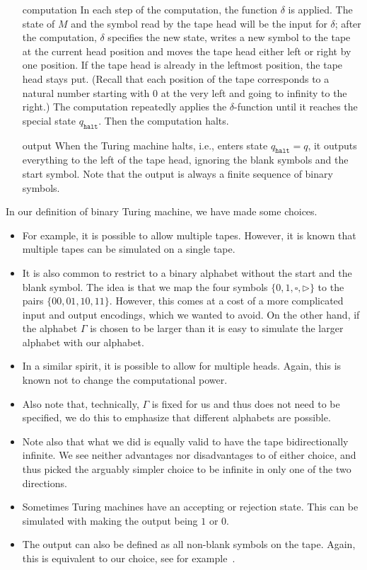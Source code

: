 \documentclass{article}
\begin{document}
\begin{definition}
\begin{itemize}[leftmargin=2cm]
    \item[computation]
    In each step of the computation, the function $\delta$ is applied.
    The state of $M$ and the symbol read by the tape head will be the input for $\delta$;
    after the computation, $\delta$ specifies the new state, writes a new symbol to the tape at the current head position and moves the tape head either left or right by one position.
    If the tape head is already in the leftmost 
    position, the tape head stays put.
    (Recall that each position of the tape corresponds to a natural number starting with $0$ at the very left and going to infinity to the right.)
    The computation repeatedly applies the $\delta$-function until it reaches the special state $q_\texttt{halt}$.
    Then the computation halts.
    \item[output] When the Turing machine halts, i.e., enters state $q_{\texttt{halt}} = q$, it outputs everything to the left of the tape head, ignoring the blank symbols and the start symbol.
    Note that the output is always a finite sequence of binary symbols.
\end{itemize}


\end{definition}
In our definition of binary Turing machine, we have made some choices.
\begin{itemize}
    \item For example, it is possible to allow multiple tapes.
However, it is known that multiple tapes can be simulated on a single tape.
    \item It is also common to restrict to a binary alphabet without the start and the blank symbol.
The idea is that we map the four symbols $\{0, 1, \square, \rhd\}$ to the pairs $\{00, 01, 10, 11\}$.
However, this comes at a cost of a more complicated input and output encodings, which we wanted to avoid.
On the other hand, if the alphabet $\Gamma$ is chosen to be larger than it is easy to simulate the larger alphabet with our alphabet.
    \item In a similar spirit, it is possible to allow for multiple heads. Again, this is known not to change the computational power.
    \item Also note that, technically, $\Gamma$ is fixed for us and thus does not need to be specified, we do this to emphasize that different alphabets are possible.
    \item Note also that what we did is equally valid to have the tape bidirectionally infinite.
    We see neither advantages nor disadvantages to of either choice, and thus picked the arguably simpler choice to be infinite in only one of the two directions.
    \item Sometimes Turing machines have an accepting or rejection state.
    This can be simulated with making the output being $1$ or $0$.
    \item The output can also be defined as all non-blank symbols on the tape.
    Again, this is equivalent to our choice, see for example~\cite{vEB12}.
\end{itemize}
\end{document}

